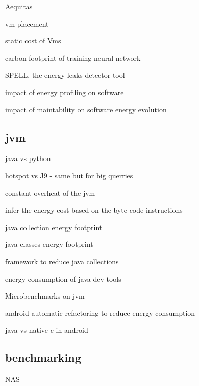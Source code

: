 Aequitas \cite{ribic2016aequitas}

vm placement \cite{mishra2018energy}

\citeauthor{mishra2018energy}

static cost of Vms \cite{kurpicz2016much}



carbon footprint of training neural network \cite{strubell2019energy}

SPELL, the energy leaks detector tool \cite{pereira2017helping}

impact of energy profiling on software \cite{jagroep2017energy}

impact of maintability on software energy evolution \cite{calero2021does}

\subsection{jvm}

java vs python \cite{destefanis_statistical_2016}

hotspot vs J9 \cite{oi2011power} - same but for big querries \cite{chiba2018towards}

constant overheat of the jvm \cite{lafond2006energy}

infer the energy cost based on the byte code instructions \cite{ma2017biogeography}

java collection energy footprint  \cite{pinto2016comprehensive} \cite{fernandes2017assisting}

java classes energy footprint \cite{hasan2016energy}

framework to reduce java collections \cite{manotas2014seeds}

energy consumption of java dev tools \cite{baskar2013experimental}

Microbenchmarks on jvm \cite{longo2019reducing} \cite{baskar2013experimental}

android automatic refactoring to reduce energy consumption \cite{banerjee2016automated} \cite{rodriguez2017reducing}

java vs native c in android \cite{corral2014method}





\subsection{benchmarking}

NAS \cite{bailey_nas_nodate}



